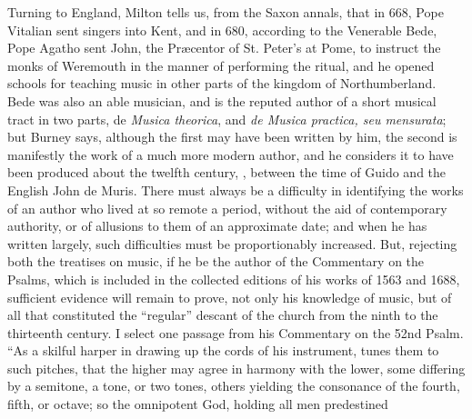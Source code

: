 Turning to England, Milton tells us, from the Saxon annals, that in 668, 
Pope Vitalian sent singers into Kent, and in 680, according to the Venerable
Bede, Pope Agatho sent John, the Præcentor of St. Peter’s at Pome, to
instruct the monks of Weremouth in the manner of performing the ritual, and he
opened schools for teaching music in other parts of the kingdom of Northumberland.
Bede was also an able musician, and is the reputed author of a short
musical tract in two parts, de \textit{Musica theorica}, and \textit{de Musica practica, seu mensurata};
but Burney says, although the first may have been written by him, the
second is manifestly the work of a much more modern author, and he considers it
to have been produced about the twelfth century, \ie, between the time of Guido
and the English John de Muris. There must always be a difficulty in identifying
the works of an author who lived at so remote a period, without the aid of
contemporary authority, or of allusions to them of an approximate date; and when
he has written largely, such difficulties must be proportionably increased. But,
rejecting both the treatises on music, if he be the author of the Commentary on
the Psalms, which is included in the collected editions of his works of 1563
and 1688, sufficient evidence will remain to prove, not only his knowledge of
music, but of all that constituted the “regular” descant of the church from the
ninth to the thirteenth century. I select one passage from his Commentary on
the 52nd Psalm. “As a skilful harper in drawing up the cords of his instrument,
tunes them to such pitches, that the higher may agree in harmony with the lower,
some differing by a semitone, a tone, or two tones, others yielding the consonance
of the fourth, fifth, or octave; so the omnipotent God, holding all men predestined
